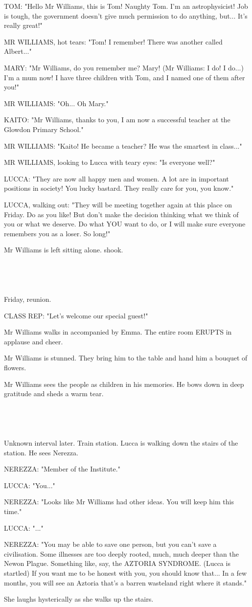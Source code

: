 \documentclass[11pt]{article}
\begin{document}
TOM: "Hello Mr Williams, this is Tom! 
Naughty Tom.
I'm an astrophysicist! 
Job is tough, the government doesn't give much permission to do anything, but... It's really great!"

MR WILLIAMS, hot tears: "Tom! I remember! There was another called Albert..."

MARY: "Mr Williams, do you remember me? Mary! (Mr Williams: I do! I do...) 
I'm a mum now! I have three children with Tom, and I named one of them after you!"

MR WILLIAMS: "Oh... Oh Mary."

KAITO: "Mr Williams, thanks to you, I am now a successful teacher at the Glowdon Primary School."

MR WILLIAMS: "Kaito! He became a teacher? 
He was the smartest in class..."

MR WILLIAMS, looking to Lucca with teary eyes: "Is everyone well?"

LUCCA: "They are now all happy men and women. A lot are in important positions in society!
You lucky bastard. They really care for you, you know."

LUCCA, walking out: "They will be meeting together again at this place on Friday.
Do as you like!
But don't make the decision thinking what we think of you or what we deserve.
Do what YOU want to do, or I will make sure everyone remembers you as a loser.
So long!"

Mr Williams is left sitting alone. shook.

\ 

\ 

Friday, reunion.

CLASS REP: "Let's welcome our special guest!"

Mr Williams walks in accompanied by Emma.
The entire room ERUPTS in applause and cheer.

Mr Williams is stunned.
They bring him to the table and hand him a bouquet of flowers.

Mr Williams sees the people as children in his memories.
He bows down in deep gratitude and sheds a warm tear.

\ 

\ 

Unknown interval later.
Train station.
Lucca is walking down the stairs of the station.
He sees Nerezza. 

NEREZZA: "Member of the Institute."

LUCCA: "You..."

NEREZZA: "Looks like Mr Williams had other ideas.
You will keep him this time."

LUCCA: "..."

NEREZZA: "You may be able to save one person, but you can't save a civilisation.
Some illnesses are too deeply rooted, much, much deeper than the Newon Plague.
Something like, say, the AZTORIA SYNDROME. (Lucca is startled)
If you want me to be honest with you, you should know that...
In a few months, you will see an Aztoria that's a barren wasteland right where it stands."

She laughs hysterically as she walks up the stairs.
\end{document}
